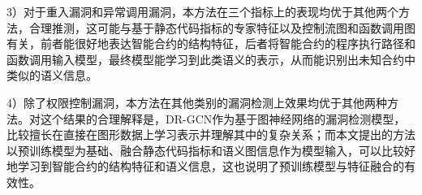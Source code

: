 3）对于重入漏洞和异常调用漏洞，本方法在三个指标上的表现均优于其他两个方法，合理推测，这可能与基于静态代码指标的专家特征以及控制流图和函数调用图有关，前者能很好地表达智能合约的结构特征，后者将智能合约的程序执行路径和函数调用输入模型，最终模型能学习到此类语义的表示，从而能识别出未知合约中类似的语义信息。

4）除了权限控制漏洞，本方法在其他类别的漏洞检测上效果均优于其他两种方法。对这个结果的合理解释是，DR-GCN作为基于图神经网络的漏洞检测模型，比较擅长在直接在图形数据上学习表示并理解其中的复杂关系；而本文提出的方法以预训练模型为基础、融合静态代码指标和语义图信息作为模型输入，可以比较好地学习到智能合约的结构特征和语义信息，这也说明了预训练模型与特征融合的有效性。




